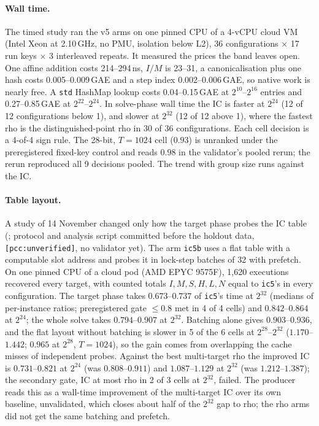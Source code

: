 \paragraph{Wall time.} The timed study ran the v5 arms on one pinned CPU of a
4-vCPU cloud VM (Intel Xeon at 2.10\,GHz, no PMU, isolation below L2), 36
configurations $\times$ 17 run keys $\times$ 3 interleaved repeats. It
measured the prices the band leaves open. One affine addition costs
214--294\,ns, $I/M$ is 23--31, a canonicalisation plus one hash costs
0.005--0.009\,GAE and a step index 0.002--0.006\,GAE, so native work is
nearly free. A \texttt{std} HashMap lookup costs 0.04--0.15\,GAE at
$2^{10}$--$2^{16}$ entries and 0.27--0.85\,GAE at $2^{22}$--$2^{24}$. In
solve-phase wall time the IC is faster at $2^{24}$ (12 of 12 configurations
below 1), and slower at $2^{32}$ (12 of 12 above 1), where the
fastest rho is the distinguished-point rho in 30 of 36 configurations. Each cell
decision is a 4-of-4 sign rule. The 28-bit, $T=1024$ cell ($0.93$) is
unranked under the preregistered fixed-key control and reads $0.98$ in the
validator's pooled rerun; the rerun reproduced all 9 decisions pooled. The
trend with group size runs against the IC.

\paragraph{Table layout.} A study of 14 November changed only how the
target phase probes the IC table (;
protocol and analysis script committed before the holdout data,
\texttt{[pcc:unverified]}, no validator yet). The arm \texttt{ic5b} uses a
flat table with a computable slot address and probes it in lock-step
batches of 32 with prefetch. On one pinned CPU of a cloud pod (AMD EPYC
9575F), 1{,}620 executions recovered every target, with counted totals
$I,M,S,H,L,N$ equal to \texttt{ic5}'s in every configuration. The target
phase takes $0.673$--$0.737$ of \texttt{ic5}'s time at $2^{32}$ (medians of
per-instance ratios; preregistered gate $\le0.8$ met in 4 of 4 cells) and
$0.842$--$0.864$ at $2^{24}$; the whole solve takes $0.794$--$0.907$ at
$2^{32}$. Batching alone gives $0.903$--$0.936$, and the flat layout without
batching is slower in 5 of the 6 cells at $2^{28}$--$2^{32}$
($1.170$--$1.442$; $0.965$ at $2^{28}$, $T=1024$), so the gain comes from
overlapping the cache misses of independent probes. Against the best multi-target rho the improved IC
is $0.731$--$0.821$ at $2^{24}$ (was $0.808$--$0.911$) and $1.087$--$1.129$
at $2^{32}$ (was $1.212$--$1.387$); the secondary gate, IC at most rho in 2
of 3 cells at $2^{32}$, failed. The producer reads this as a wall-time improvement of the
multi-target IC over its own baseline, unvalidated, which closes about half
of the $2^{32}$ gap to rho; the rho arms did not get the same batching and
prefetch.

